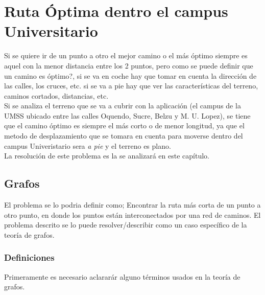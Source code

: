 \chapter{Ruta Óptima dentro el campus Universitario} %
\label{cha:ruta_optima}


Si se quiere ir de un punto a otro el mejor camino o el más óptimo siempre es aquel con la menor distancia entre los 2 puntos, pero como se puede definir que un camino es óptimo?, si se va en coche hay que tomar en cuenta la dirección de las calles, los cruces, etc. si se va a pie hay que ver las características del terreno, caminos cortados, distancias, etc.\\


Si se analiza el terreno que se va a cubrir con la aplicación (el campus de la UMSS ubicado entre las calles Oquendo, Sucre,  Belzu y M. U. Lopez), se tiene que el camino óptimo es siempre el más corto o de menor longitud, ya que el metodo de desplazamiento que se tomara en cuenta para moverse dentro del campus Univeristario sera \emph{a pie} y el terreno es plano.\\


La resolución de este problema es la se analizará en este capítulo.


  \section{Grafos} %
  \label{sec:teoria_grafos}

    El problema se lo podria definir como; Encontrar la ruta más corta de un punto a otro punto, en donde los puntos están interconectados por una red de caminos. El problema descrito se lo puede resolver/describir como un caso espec\'ifico de la teoría de grafos.


    \subsection{Definiciones} %
    \label{sub:grafos_definiciones}
      Primeramente es necesario aclarar\'ar alguno términos usados en la teoría de grafos.\\



